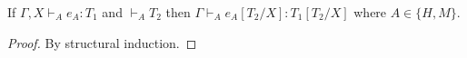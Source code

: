 \begin{lemma}
\label{tes}
If $\Gamma,X\vdash_{A}e_{A}:T_{1}$ and $\vdash_{A}T_{2}$ then $\Gamma\vdash_{A}e_{A}[T_{2}/X]:T_{1}[T_{2}/X]$ where $A\in\lbrace H,M\rbrace$.
\begin{proof}
By structural induction.
\end{proof}
\end{lemma}
